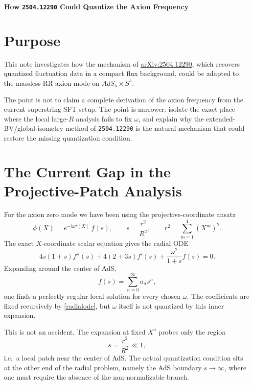 \documentclass[12pt]{article}
\begin{document}
\sloppy

\begin{center}
{\Large\bf How \texttt{2504.12290} Could Quantize the Axion Frequency}
\end{center}

\section{Purpose}

This note investigates how the mechanism of
\href{https://arxiv.org/abs/2504.12290}{arXiv:2504.12290},
which recovers quantized fluctuation data in a compact flux background, could be adapted to the
massless RR axion mode on $AdS_5\times S^5$.

The point is not to claim a complete derivation of the axion frequency from the current superstring SFT
setup.  The point is narrower: isolate the exact place where the local large-$R$ analysis fails to fix
$\omega$, and explain why the extended-BV/global-isometry method of \texttt{2504.12290} is the natural
mechanism that could restore the missing quantization condition.

\section{The Current Gap in the Projective-Patch Analysis}

For the axion zero mode we have been using the projective-coordinate ansatz
\begin{equation}
\phi(X)=e^{-i\omega\tau(X)}\,f(s),
\qquad
s=\frac{r^2}{R^2},
\qquad
r^2=\sum_{m=1}^4 (X^m)^2.
\end{equation}
The exact $X$-coordinate scalar equation gives the radial ODE
\begin{equation}
4s(1+s)f''(s)+4(2+3s)f'(s)+\frac{\omega^2}{1+s}f(s)=0.
\label{radialode}
\end{equation}
Expanding around the center of AdS,
\begin{equation}
f(s)=\sum_{n=0}^{\infty} a_n s^n,
\end{equation}
one finds a perfectly regular local solution for every chosen $\omega$.  The coefficients are fixed
recursively by \eqref{radialode}, but $\omega$ itself is not quantized by this inner expansion.

This is not an accident.  The expansion at fixed $X^a$ probes only the region
\begin{equation}
s=\frac{r^2}{R^2}\ll 1,
\end{equation}
i.e.\ a local patch near the center of AdS.  The actual quantization condition sits at the other end of
the radial problem, namely the AdS boundary $s\to\infty$, where one must require the absence of the
non-normalizable branch.
\end{document}
